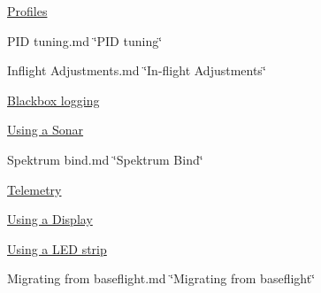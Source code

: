 \begin{DoxyItemize}
\item \hyperlink{Profiles_8md}{Profiles}
\item P\+I\+D tuning.\+md \char`\"{}\+P\+I\+D tuning\char`\"{}
\item Inflight Adjustments.\+md \char`\"{}\+In-\/flight Adjustments\char`\"{}
\item \hyperlink{Blackbox_8md}{Blackbox logging}
\item \hyperlink{Sonar_8md}{Using a Sonar}
\item Spektrum bind.\+md \char`\"{}\+Spektrum Bind\char`\"{}
\item \hyperlink{Telemetry_8md}{Telemetry}
\item \hyperlink{Display_8md}{Using a Display}
\item \hyperlink{LedStrip_8md}{Using a L\+E\+D strip}
\item Migrating from baseflight.\+md \char`\"{}\+Migrating from baseflight\char`\"{} 
\end{DoxyItemize}
